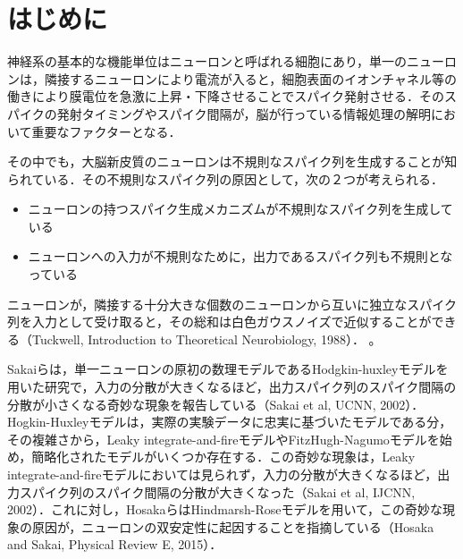 \documentclass[dvipdfmx, A4j, twocolumn, 10.5pt]{jsarticle}
\begin{document}
\thispagestyle{empty} %
\section{はじめに}

神経系の基本的な機能単位はニューロンと呼ばれる細胞にあり，単一のニューロンは，隣接するニューロンにより電流が入ると，細胞表面のイオンチャネル等の働きにより膜電位を急激に上昇・下降させることでスパイク発射させる．そのスパイクの発射タイミングやスパイク間隔が，脳が行っている情報処理の解明において重要なファクターとなる．

その中でも，大脳新皮質のニューロンは不規則なスパイク列を生成することが知られている．その不規則なスパイク列の原因として，次の２つが考えられる．

\begin{itemize}
 \item ニューロンの持つスパイク生成メカニズムが不規則なスパイク列を生成している
 \item ニューロンへの入力が不規則なために，出力であるスパイク列も不規則となっている
\end{itemize}

ニューロンが，隣接する十分大きな個数のニューロンから互いに独立なスパイク列を入力として受け取ると，その総和は白色ガウスノイズで近似することができる（Tuckwell, Introduction to Theoretical Neurobiology, 1988）．
\cite{lite1}。

Sakaiらは，単一ニューロンの原初の数理モデルであるHodgkin-huxleyモデルを用いた研究で，入力の分散が大きくなるほど，出力スパイク列のスパイク間隔の分散が小さくなる奇妙な現象を報告している（Sakai et al, UCNN, 2002）．Hogkin-Huxleyモデルは，実際の実験データに忠実に基づいたモデルである分，その複雑さから，Leaky integrate-and-fireモデルやFitzHugh-Nagumoモデルを始め，簡略化されたモデルがいくつか存在する．この奇妙な現象は，Leaky integrate-and-fireモデルにおいては見られず，入力の分散が大きくなるほど，出力スパイク列のスパイク間隔の分散が大きくなった（Sakai et al, IJCNN, 2002）．これに対し，HosakaらはHindmarsh-Roseモデルを用いて，この奇妙な現象の原因が，ニューロンの双安定性に起因することを指摘している（Hosaka and Sakai, Physical Review E, 2015）．
\end{document}
